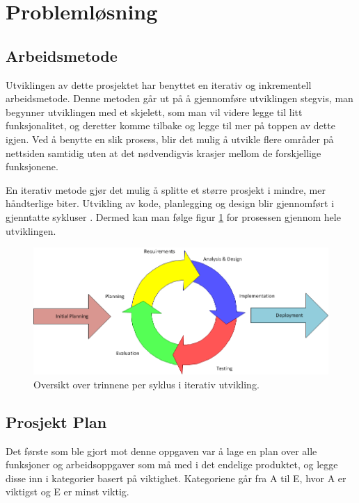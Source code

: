 \section{Problemløsning}
\subsection{Arbeidsmetode}
Utviklingen av dette prosjektet har benyttet en iterativ og inkrementell arbeidsmetode. Denne metoden går ut på å gjennomføre utviklingen stegvis, man begynner utviklingen med et skjelett, som man vil videre legge til litt funksjonalitet, og deretter komme tilbake og legge til mer på toppen av dette igjen. Ved å benytte en slik prosess, blir det mulig å utvikle flere områder på nettsiden samtidig uten at det nødvendigvis krasjer mellom de forskjellige funksjonene.

En iterativ metode gjør det mulig å splitte et større prosjekt i mindre, mer håndterlige biter. Utvikling av kode, planlegging og design blir gjennomført i gjenntatte sykluser \cite{method:iterative_fig}. Dermed kan man følge figur \ref{fig:iterative_development} for prosessen gjennom hele utviklingen.

 \begin{figure}[htbp]
	\centering
		\includegraphics[scale=0.5]{Bilder/iterativ_utvikling.png}
	\caption[Iterativ Utviklings Diagram]{Oversikt over trinnene per syklus i iterativ utvikling. } %
	\label{fig:iterative_development}
\end{figure}


\subsection{Prosjekt Plan}
Det første som ble gjort mot denne oppgaven var å lage en plan over alle funksjoner og arbeidsoppgaver som må med i det endelige produktet, og legge disse inn i kategorier basert på viktighet. Kategoriene går fra A til E, hvor A er viktigst og E er minst viktig.
